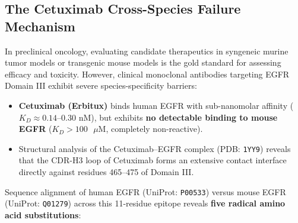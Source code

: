 \documentclass[11pt]{article}
\begin{document}
\subsection{The Cetuximab Cross-Species Failure Mechanism}
In preclinical oncology, evaluating candidate therapeutics in syngeneic murine tumor models or transgenic mouse models is the gold standard for assessing efficacy and toxicity. However, clinical monoclonal antibodies targeting EGFR Domain III exhibit severe species-specificity barriers:
\begin{itemize}
    \item \textbf{Cetuximab (Erbitux)} binds human EGFR with sub-nanomolar affinity ($K_D \approx 0.14\text{--}0.30\text{ nM}$), but exhibits \textbf{no detectable binding to mouse EGFR} ($K_D > 100\text{ }\mu\text{M}$, completely non-reactive).
    \item Structural analysis of the Cetuximab--EGFR complex (PDB: \texttt{1YY9}) reveals that the CDR-H3 loop of Cetuximab forms an extensive contact interface directly against residues 465--475 of Domain III.
\end{itemize}

Sequence alignment of human EGFR (UniProt: \texttt{P00533}) versus mouse EGFR (UniProt: \texttt{Q01279}) across this 11-residue epitope reveals \textbf{five radical amino acid substitutions}:
\end{document}
